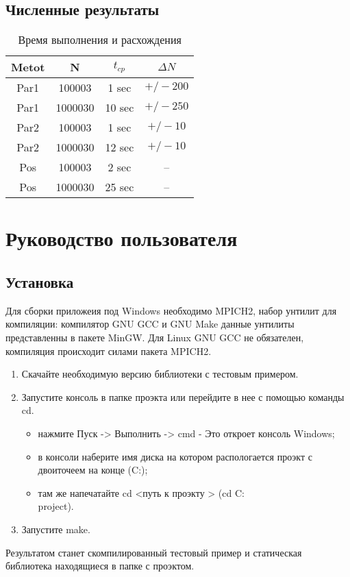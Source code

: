 \section{Численные результаты}
\begin{table}[hp]
\begin{tabular}{|c|c|c|c|}
\hline 
Metot & N & $t_{cp}$ & $\Delta N$ \\ \hline
Par1 & 100003 & 1 sec & $+/- 200 $ \\ \hline
Par1 & 1000030 & 10 sec & $+/- 250 $ \\ \hline
Par2 & 100003 & 1 sec & $+/- 10 $ \\ \hline
Par2 & 1000030 & 12 sec & $+/- 10 $ \\ \hline
Pos & 100003 & 2 sec & -- \\ \hline
Pos & 1000030 & 25 sec & -- \\ \hline
\end{tabular}
\caption{Время выполнения и расхождения}
\end{table}


\chapter{Руководство пользователя}
\section{Установка}
Для сборки приложеия под Windows необходимо MPICH2, набор унтилит для компиляции: компилятор GNU GCC и GNU Make данные унтилиты представленны в пакете MinGW. Для Linux GNU GCC не обязателен, компиляция происходит силами пакета MPICH2.
\begin{enumerate}
	\item Скачайте необходимую версию библиотеки с тестовым примером.
	\item Запустите консоль в папке проэкта или перейдите в нее с помощью команды cd.
	\begin{itemize}
		\item нажмите Пуск -> Выполнить -> cmd - Это откроет консоль Windows;
		\item в консоли наберите имя диска на котором распологается проэкт с двоиточеем на конце (C:);
		\item там же напечатайте cd <путь к проэкту > (cd C:\\project).
	\end{itemize}
	\item Запустите make.
\end{enumerate}
Результатом станет скомпилированный тестовый пример и статическая библиотека находящиеся в папке с проэктом.

